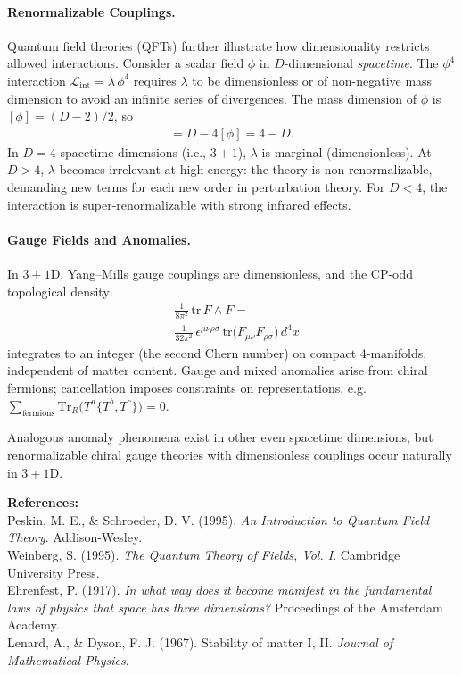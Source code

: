 \begin{technical}
    \paragraph{Renormalizable Couplings.}
    Quantum field theories (QFTs) further illustrate how dimensionality restricts allowed interactions. Consider a scalar field $\phi$ in $D$-dimensional \emph{spacetime}. The $\phi^4$ interaction $\mathcal{L}_{\mathrm{int}} = \lambda\,\phi^4$ requires $\lambda$ to be dimensionless or of non-negative mass dimension to avoid an infinite series of divergences. The mass dimension of $\phi$ is $[\phi] = (D - 2)/2$, so
    \begin{align*}  
    [\lambda] = D - 4[\phi] = 4 - D.
    \end{align*}
    In $D=4$ spacetime dimensions (i.e., $3+1$), $\lambda$ is marginal (dimensionless). At $D>4$, $\lambda$ becomes irrelevant at high energy: the theory is non-renormalizable, demanding new terms for each new order in perturbation theory. For $D<4$, the interaction is super-renormalizable with strong infrared effects.
    
    \paragraph{Gauge Fields and Anomalies.}
    In $3{+}1$D, Yang–Mills gauge couplings are dimensionless, and the CP-odd topological density
    \begin{align*}
    &\frac{1}{8\pi^2}\,\mathrm{tr}\,F\wedge F = \\
    &\frac{1}{32\pi^2}\,\epsilon^{\mu\nu\rho\sigma}\,\mathrm{tr}\big(F_{\mu\nu}F_{\rho\sigma}\big)\,d^4x
    \end{align*}
    integrates to an integer (the second Chern number) on compact 4-manifolds, independent of matter content. Gauge and mixed anomalies arise from chiral fermions; cancellation imposes constraints on representations, e.g.$    \sum_{\text{fermions}} \mathrm{Tr}_R\big(T^a\{T^b,T^c\}\big)=0$.
    
    Analogous anomaly phenomena exist in other even spacetime dimensions, but renormalizable chiral gauge theories with dimensionless couplings occur naturally in $3{+}1$D.
    
    \vspace{0.5em}
    \noindent
    \textbf{References:}\\
    {\footnotesize
    Peskin, M. E., \& Schroeder, D. V. (1995). \textit{An Introduction to Quantum Field Theory}. Addison-Wesley.\\
    Weinberg, S. (1995). \textit{The Quantum Theory of Fields, Vol. I}. Cambridge University Press.\\
    Ehrenfest, P. (1917). \textit{In what way does it become manifest in the fundamental laws of physics that space has three dimensions?} Proceedings of the Amsterdam Academy.\\
    Lenard, A., \& Dyson, F. J. (1967). Stability of matter I, II. \textit{Journal of Mathematical Physics}.
    }
    
\end{technical}
    